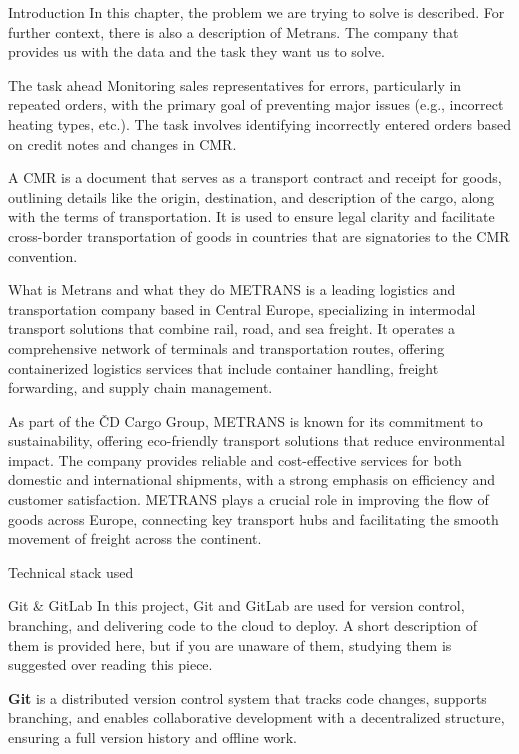 \chap Introduction
In this chapter, the problem we are trying to solve is described. For further context, there is also a description of Metrans. The company that provides us with the data and the task they want us to solve. 

\sec The task ahead
Monitoring sales representatives for errors, particularly in repeated orders, with the primary goal of preventing major issues (e.g., incorrect heating types, etc.).
The task involves identifying incorrectly entered orders based on credit notes and changes in CMR.

A CMR is a document that serves as a transport contract and receipt for goods, outlining details like the origin, destination, and description of the cargo, along with the terms of transportation. It is used to ensure legal clarity and facilitate cross-border transportation of goods in countries that are signatories to the CMR convention.

\sec What is Metrans and what they do
METRANS is a leading logistics and transportation company based in Central Europe, specializing in intermodal transport solutions that combine rail, road, and sea freight. It operates a comprehensive network of terminals and transportation routes, offering containerized logistics services that include container handling, freight forwarding, and supply chain management.

As part of the ČD Cargo Group, METRANS is known for its commitment to sustainability, offering eco-friendly transport solutions that reduce environmental impact. The company provides reliable and cost-effective services for both domestic and international shipments, with a strong emphasis on efficiency and customer satisfaction. METRANS plays a crucial role in improving the flow of goods across Europe, connecting key transport hubs and facilitating the smooth movement of freight across the continent.

\sec Technical stack used

\secc Git \& GitLab
In this project, Git and GitLab are used for version control, branching, and delivering code to the cloud to deploy. A short description of them is provided here, but if you are unaware of them, studying them is suggested over reading this piece.

{\bf Git} is a distributed version control system that tracks code changes, supports branching, and enables collaborative development with a decentralized structure, ensuring a full version history and offline work.

